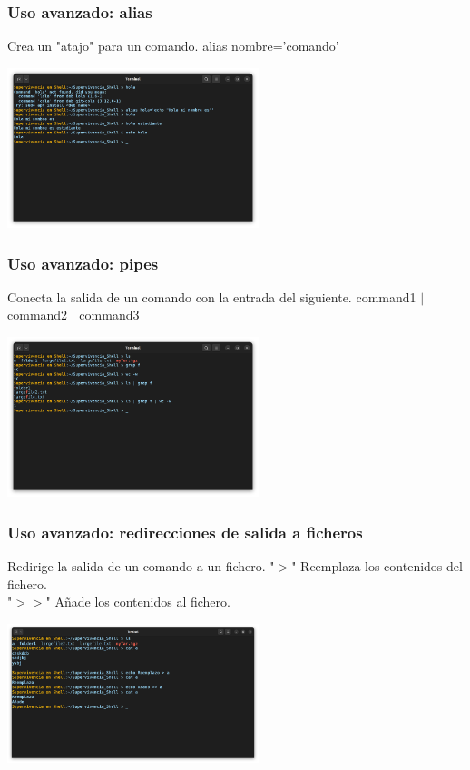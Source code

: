\documentclass[10pt]{beamer}
\begin{document}
	\begin{frame}
		\frametitle{Uso avanzado: alias}
		\begin{alertblock}{Crea un "atajo" para un comando.}
			alias nombre='comando'
		\end{alertblock}
		\begin{center}
			\includegraphics[width=0.55\textwidth]{alias}
		\end{center}
	\end{frame}	

	\begin{frame}
		\frametitle{Uso avanzado: pipes}
		\begin{alertblock}{Conecta la salida de un comando con la entrada del siguiente.}
			command1 $|$ command2 $|$ command3 
		\end{alertblock}
		\begin{center}
			\includegraphics[width=0.55\textwidth]{pipes}
		\end{center}
	\end{frame}
	
	\begin{frame}
		\frametitle{Uso avanzado: redirecciones de salida a ficheros}
		\begin{alertblock}{Redirige la salida de un comando a un fichero.}
			"$>$" Reemplaza los contenidos del fichero.\\
			"$>>$" Añade los contenidos al fichero.
		\end{alertblock}
		\begin{center}
			\includegraphics[width=0.55\textwidth]{redir}
		\end{center}
	\end{frame}	
\end{document}
